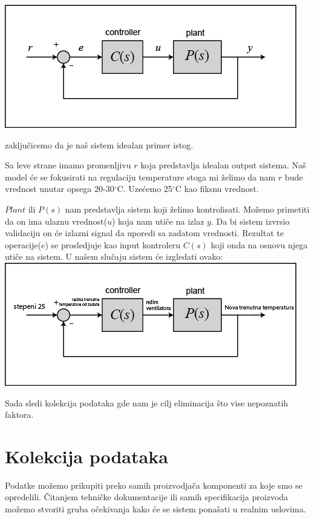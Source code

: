 \documentclass[a4paper,11pt]{book}
\begin{document}
\includegraphics[width=\textwidth]{feedback_block.png}

zaključicemo da je naš sistem idealan primer istog.

Sa leve strane imamo promenljivu $r$ koja predstavlja idealan output sistema. Naš model će se fokusirati na regulaciju temperature stoga mi želimo da nam $r$ bude vrednost unutar opsega 20-30$^\circ$C. Uzećemo 25$^\circ$C kao fiksnu vrednost. 

$Plant$ ili $P(s)$ nam predstavlja sistem koji želimo kontrolisati. Možemo primetiti da on ima ulaznu vrednost($u$) koja nam utiče na izlaz $y$. Da bi sistem izvrsio validaciju on će izlazni signal da uporedi sa zadatom vrednosti. Rezultat te operacije($e$) se prosledjuje kao input kontroleru $C(s)$ koji onda na osnovu njega utiče na sistem. U našem slučaju sistem će izgledati ovako:\\

\includegraphics[width=\textwidth]{feedback.png}

Sada sledi kolekcija podataka gde nam je cilj eliminacija što vise nepoznatih faktora.

\section{Kolekcija podataka}

Podatke možemo prikupiti preko samih proizvodjača komponenti za koje smo se opredelili. Čitanjem tehničke dokumentacije ili samih specifikacija proizvoda možemo stvoriti gruba očekivanja kako će se sistem ponašati u realnim uslovima. \\
\end{document}

